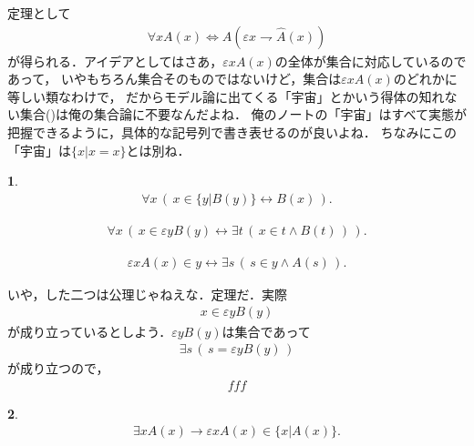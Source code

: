 \documentclass[a4j,10.5pt,oneside,openany]{jsbook}
\theoremstyle{mystyle}
\newtheorem{thm}{\color{DarkMidnightBlue}{定理}}[section]
\newtheorem{axm}[thm]{\color{Mahogany}{公理}}
\begin{document}
	定理として
	\begin{align}
		\forall x A(x) \Longleftrightarrow A(\varepsilon x \rightharpoondown \hat{A}(x))
	\end{align}
	が得られる．アイデアとしてはさあ，$\varepsilon x A(x)$の全体が集合に対応しているのであって，
	いやもちろん集合そのものではないけど，集合は$\varepsilon x A(x)$のどれかに等しい類なわけで，
	だからモデル論に出てくる「宇宙」とかいう得体の知れない集合()は俺の集合論に不要なんだよね．
	俺のノートの「宇宙」はすべて実態が把握できるように，具体的な記号列で書き表せるのが良いよね．
	ちなみにこの「宇宙」は$\{x|x=x\}$とは別ね．
	
	\begin{screen}
		\begin{axm}
			\begin{align}
				\forall x\, \left(\, x \in \{y|B(y)\} \leftrightarrow B(x)\, \right).
			\end{align}
			
			\begin{align}
				\forall x\, \left(\, x \in \varepsilon y B(y) \leftrightarrow
				\exists t\, \left(\, x \in t \wedge B(t)\, \right)\, \right).
			\end{align}
			
			\begin{align}
				\varepsilon x A(x) \in y \leftrightarrow
				\exists s\, \left(\, s \in y \wedge A(s)\, \right).
			\end{align}
		\end{axm}
	\end{screen}
	
	いや，した二つは公理じゃねえな．定理だ．実際
	\begin{align}
		x \in \varepsilon y B(y)
	\end{align}
	が成り立っているとしよう．$\varepsilon y B(y)$は集合であって
	\begin{align}
		\exists s\, \left(\, s = \varepsilon y B(y)\, \right)
	\end{align}
	が成り立つので，
	\begin{align}
		fff
	\end{align}
	
	\begin{screen}
		\begin{thm}
			\begin{align}
				\exists x A(x) \rightarrow \varepsilon x A(x) \in \{x|A(x)\}.
			\end{align}
		\end{thm}
	\end{screen}
	
\end{document}
